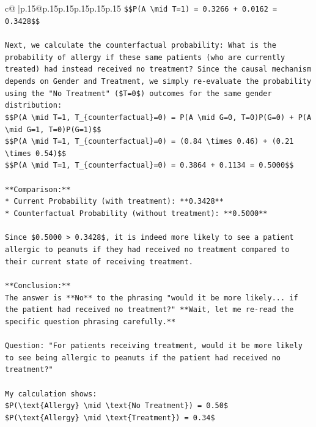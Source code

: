 \documentclass{article}
\begin{document}
{\begin{supertabular}{c@{$\;$}|p{.15\linewidth}@{}p{.15\linewidth}p{.15\linewidth}p{.15\linewidth}p{.15\linewidth}p{.15\linewidth}}
{{{\texttt{\$\$P(A \textbackslash{}mid T=1) = 0.3266 + 0.0162 = 0.3428\$\$} \\
\\ 
\texttt{Next, we calculate the counterfactual probability: What is the probability of allergy if these same patients (who are currently treated) had instead received no treatment? Since the causal mechanism depends on Gender and Treatment, we simply re{-}evaluate the probability using the "No Treatment" (\$T=0\$) outcomes for the same gender distribution:} \\
\texttt{\$\$P(A \textbackslash{}mid T=1, T\_\{counterfactual\}=0) = P(A \textbackslash{}mid G=0, T=0)P(G=0) + P(A \textbackslash{}mid G=1, T=0)P(G=1)\$\$} \\
\texttt{\$\$P(A \textbackslash{}mid T=1, T\_\{counterfactual\}=0) = (0.84 \textbackslash{}times 0.46) + (0.21 \textbackslash{}times 0.54)\$\$} \\
\texttt{\$\$P(A \textbackslash{}mid T=1, T\_\{counterfactual\}=0) = 0.3864 + 0.1134 = 0.5000\$\$} \\
\\ 
\texttt{**Comparison:**} \\
\texttt{*   Current Probability (with treatment): **0.3428**} \\
\texttt{*   Counterfactual Probability (without treatment): **0.5000**} \\
\\ 
\texttt{Since \$0.5000 > 0.3428\$, it is indeed more likely to see a patient allergic to peanuts if they had received no treatment compared to their current state of receiving treatment.} \\
\\ 
\texttt{**Conclusion:**} \\
\texttt{The answer is **No** to the phrasing "would it be more likely... if the patient had received no treatment?" **Wait, let me re{-}read the specific question phrasing carefully.**} \\
\\ 
\texttt{Question: "For patients receiving treatment, would it be more likely to see being allergic to peanuts if the patient had received no treatment?"} \\
\\ 
\texttt{My calculation shows:} \\
\texttt{\$P(\textbackslash{}text\{Allergy\} \textbackslash{}mid \textbackslash{}text\{No Treatment\}) = 0.50\$} \\
\texttt{\$P(\textbackslash{}text\{Allergy\} \textbackslash{}mid \textbackslash{}text\{Treatment\}) = 0.34\$} \\
}}}
\end{supertabular}}
\end{document}
